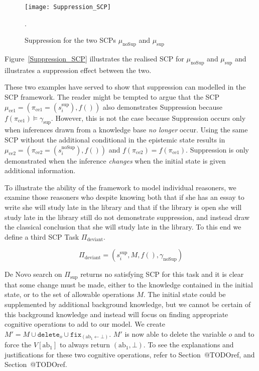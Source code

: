 \begin{figure}
\centering \texttt{[image: Suppression\_SCP]}
\caption{Suppression for the two SCPs $\mu_\text{noSup}$ and $\mu_\text{sup}$}.
\label{fig:Suppression_SCP}
\end{figure}

Figure~\ref{Suppression_SCP} illustrates the realised SCP for $\mu_\text{noSup}$ and $\mu_\text{sup}$ and illustrates a suppression effect between the two.

These two examples have served to show that suppression can modelled in the SCP framework. The reader might be tempted to argue that the SCP $\mu_\text{ce1} = (\pi_\text{ce1}=(s^\text{sup}_i),f())$ also demonstrates Suppression because $f(\pi_\text{ce1})\models \gamma_\text{sup}$. However, this is not the case because Suppression occurs only when inferences drawn from a knowledge base \textit{no longer} occur. Using the same SCP without the additional conditional in the epistemic state results in $\mu_\text{ce2} = (\pi_\text{ce2}=(s^\text{noSup}_i),f())$ and $f(\pi_\text{ce2})=f(\pi_\text{ce1})$. Suppression is only demonstrated when the inference \textit{changes} when the initial state is given additional information.

To illustrate the ability of the framework to model individual reasoners, we examine those reasoners who despite knowing both that if she has an essay to write she will study late in the library and that if the library is open she will study late in the library still do not demonstrate suppression, and instead draw the classical conclusion that she will study late in the library. To this end we define a third SCP Task $\Pi_\text{deviant}$.

\[\Pi_\text{deviant}=(s_i^{\text{sup}},M,f(),\gamma_{\text{noSup}})\]

De Novo search on $\Pi_\text{sup}$ returns no satisfying SCP for this task and it is clear that some change must be made, either to the knowledge contained in the initial state, or to the set of allowable operations $M$. The initial state could be supplemented by additional background knowledge, but we cannot be certain of this background knowledge and instead will focus on finding appropriate cognitive operations to add to our model. We create $M'=M\cup \texttt{delete}_o \cup \texttt{fix}_{(\text{ab}_1\leftarrow \bot)}$. $M'$ is now able to delete the variable $o$ and to force the $V[\text{ab}_1]$ to always return $(\text{ab}_1,\bot)$. To see the explanations and justifications for these two cognitive operations, refer to Section~@TODOref, and Section~@TODOref.

